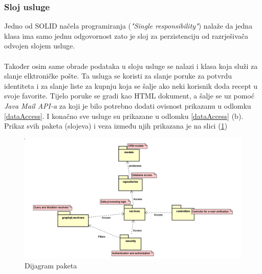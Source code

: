 \documentclass[times, utf8, zavrsni]{fer}
\begin{document}
\subsubsection{Sloj usluge}
\label{serviceLayer}
Jedno od SOLID načela programiranja (\textit{"Single responsibility"}) nalaže da jedna klasa ima samo jednu odgovornost
zato je sloj za perzistenciju od razrješivača odvojen slojem usluge.
\\\\
Također osim same obrade podataka u sloju usluge se nalazi i klasa koja služi za slanje elktroničke pošte.
Ta usluga se koristi za slanje poruke za potvrdu identiteta i za slanje liste za kupnju
koja se šalje ako neki korisnik doda recept u svoje favorite. Tijelo poruke se gradi
kao HTML dokument, a šalje se uz pomoć \textit{Java Mail API-a} za koji je bilo potrebno dodati ovisnost
prikazanu u odlomku \ref{dataAccess}. I konačno sve usluge su prikazane u odlomku \ref{dataAccess} (b).
Prikaz svih paketa (slojeva) i veza između njih prikazana je na slici (\ref{fig:packageDijagram})
\begin{figure}[h]
      \centering
      \includegraphics[width=\textwidth]{packageDiagram.png}
      \caption{Dijagram paketa}
      \label{fig:packageDijagram}
\end{figure}
\end{document}
